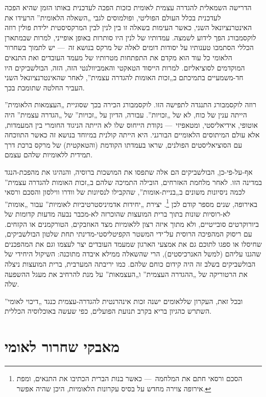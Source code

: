 הדרישה השמאלית להגדרה עצמית לאומית כזכות הפכה לעדכנית באותו הזמן שהיא הפכה לעדכנית בכלל העולם הפוליטי, ופולמוסים לגבי „השאלה הלאומית” הרעידו את האינטרנציונאל השני, כאשר העימות בשאלה זו בין לנין לבין המרקסיסטית ילידת פולין רוזה לוקסמבורג הפך לידוע לשמצה. עמדותיו של לנין היו סותרות באופן אופייני, למרות שבמתארן הכללי הסתמכו טענותיו על יסודות דומים לאלה של מרקס בנושא זה~— יש לתמוך בשחרור הלאומי כל עוד הוא מקדם את התפתחות מטרותיו של מעמד העובדים ואת התנאים המוקדמים לסוציאליזם. למרות הייסוד הטאקטי והאמביוולנטי הזה, הזה, הבולשביקים היו חד-משמעיים בתמיכתם ב„זכות האומות להגדרה עצמית”, לאחר שהאינטרנציונאל השני העביר החלטה שתומכת בכך.

רוזה לוקסמבורג התנגדה לתפישה הזו. לוקסמבורג הכירה בכך שסוגיית „העצמאות הלאומית” הייתה ענין של כוח, לא של „זכויות”. עבורה, הדיון על „זכויות” של „הגדרה עצמית” היה אוטופי, אידיאליסטי, ומטאפיזי~— נקודת הייחוס שלו לא הייתה הניגוד החומרי בין המעמדות, אלא עולם המיתוסים הלאומיים הבורגני. היא הייתה קולנית במיוחד בנושא זה כאשר התווכחה עם הסוציאליסטים הפולנים, שראו בעמדתו הקודמת (והטאקטית) של מרקס ברכת דרך תמידית ללאומיות שלהם עצמם.

אף-על-פי-כן, הבולשביקים הם אלה שתפסו את המושכות ברוסיה, והנהיגו את מהפכת-הנגד במדינה הזו. לאחר מלחמת האזרחים, הובילה התמיכה שלהם ב„זכות האומות להגדרה עצמית” לכמה ניסיונות משונים ב„בניית-אומות”, שהקבילו לנסיונות של וודרו ווילסון והסכם ורסאי באירופה, שנים מספר קודם לכן \footnote{הסכם ורסאי חתם את המלחמה~— כאשר בנות הברית הכתיבו את התנאים, ומפת אירופה צוירה מחדש על בסיס עקרונות הלאומיות, היכן שהיה אפשר.}. יצירת „יחידות אדמיניסטרטיביות לאומיות” עבור „אומות” לא-רוסיות שונות בתוך ברית המועצות שהוכרזה לא-מכבר נבעה מדעות קדומות של ביורוקרטים סובייטיים, ולא מתוך איזה רצון ללאומיות מצד האוזבקים, הטורקמנים או הקזחים. עם ריסוק המהפיכה הרוסית על־ידי המשטר הקפיטליסטי-מדינתי תחת שלטון הבולשביקים, שחיסלו או ספגו לתוכם גם את אמצעי הארגון שמעמד העובדים יצר לעצמו וגם את המהפכנים שהגנו עליהם (למשל האנרכיסטים), הרי שהשאלה ממילא איבדה מתוכנה: השיקול היחידי של הבולשביקים בשלב זה היה קידום כוחם שלהם. כמו יריבתה המערבית, ברית המועצות ניצלה את הרטוריקה של „ההגדרה העצמית” ו„העצמאות” על מנת להרחיב את מעגל ההשפעה שלה.

ובכל זאת, העקרון שללאומים ישנה זכות אינהרנטית להגדרה-עצמית כנגד „דיכוי לאומי” השתרש כהגיון בריא בקרב תנועת הפועלים, כפי שעשה באוכלוסיה הכללית.



\section*{מאבקי שחרור לאומי}

